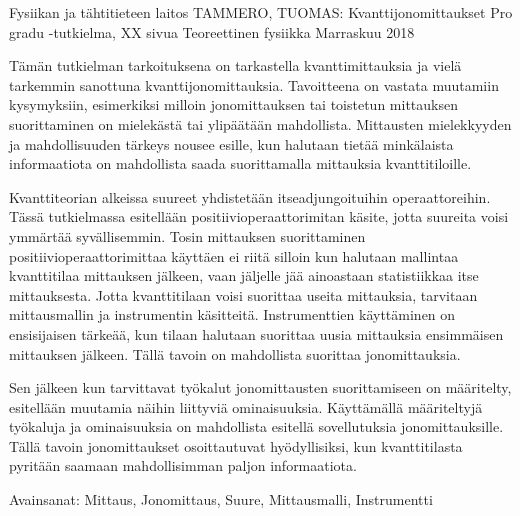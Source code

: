 \documentclass[a4paper,12pt]{wihuri}
\begin{document}
\begin{tiivistelma2}
        {Fysiikan ja tähtitieteen laitos}%
        {TAMMERO, TUOMAS:}%
        {Kvanttijonomittaukset}%
        {Pro gradu -tutkielma, XX sivua}%
        {Teoreettinen fysiikka}%
        {Marraskuu 2018}%

Tämän tutkielman tarkoituksena on tarkastella kvanttimittauksia ja vielä tarkemmin sanottuna kvanttijonomittauksia. Tavoitteena on vastata muutamiin kysymyksiin, esimerkiksi milloin jonomittauksen tai toistetun mittauksen suorittaminen on mielekästä tai ylipäätään mahdollista. Mittausten mielekkyyden ja mahdollisuuden tärkeys nousee esille, kun halutaan tietää minkälaista informaatiota on mahdollista saada suorittamalla mittauksia kvanttitiloille.

Kvanttiteorian alkeissa suureet yhdistetään itseadjungoituihin operaattoreihin. Tässä tutkielmassa esitellään positiivioperaattorimitan käsite, jotta suureita voisi ymmärtää syvällisemmin. Tosin mittauksen suorittaminen positiivioperaattorimittaa käyttäen ei riitä silloin kun halutaan mallintaa kvanttitilaa mittauksen jälkeen, vaan jäljelle jää ainoastaan statistiikkaa itse mittauksesta. Jotta kvanttitilaan voisi suorittaa useita mittauksia, tarvitaan mittausmallin ja instrumentin käsitteitä. Instrumenttien käyttäminen on ensisijaisen tärkeää, kun tilaan halutaan suorittaa uusia mittauksia ensimmäisen mittauksen jälkeen. Tällä tavoin on mahdollista suorittaa jonomittauksia.

Sen jälkeen kun tarvittavat työkalut jonomittausten suorittamiseen on määritelty, esitellään muutamia näihin liittyviä ominaisuuksia. Käyttämällä määriteltyjä työkaluja ja ominaisuuksia on mahdollista esitellä sovellutuksia jonomittauksille. Tällä tavoin jonomittaukset osoittautuvat hyödyllisiksi, kun kvanttitilasta pyritään saamaan mahdollisimman paljon informaatiota.


\noindent Avainsanat: Mittaus, Jonomittaus, Suure, Mittausmalli, Instrumentti
\end{tiivistelma2}
\end{document}
